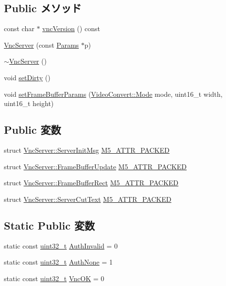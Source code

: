 \subsection*{Public メソッド}
\begin{DoxyCompactItemize}
\item 
const char $\ast$ \hyperlink{group__VncConstants_ga36bab5b0163b272b816361d6214c3f14}{vncVersion} () const 
\item 
\hyperlink{classVncServer_a0438267d56345e85e9422a89bea5c886}{VncServer} (const \hyperlink{classVncServer_a9bc94e8c47d227e70719e2f0b14d23d8}{Params} $\ast$p)
\item 
\hyperlink{classVncServer_a13ae0e928ec930d77353cb1bd42e36a1}{$\sim$VncServer} ()
\item 
void \hyperlink{classVncServer_a92a590790db6444ca7a79eaf5fbcb0d9}{setDirty} ()
\item 
void \hyperlink{classVncServer_a9abef13e07371ccf4a89883649f1bcc5}{setFrameBufferParams} (\hyperlink{classVideoConvert_a46c8a310cf4c094f8c80e1cb8dc1f911}{VideoConvert::Mode} mode, uint16\_\-t width, uint16\_\-t height)
\end{DoxyCompactItemize}
\subsection*{Public 変数}
\begin{DoxyCompactItemize}
\item 
struct \hyperlink{structVncServer_1_1ServerInitMsg}{VncServer::ServerInitMsg} \hyperlink{group__VncConstants_ga2f0a8a1f1c40593e1e01ce4b8087d792}{M5\_\-ATTR\_\-PACKED}
\item 
struct \hyperlink{structVncServer_1_1FrameBufferUpdate}{VncServer::FrameBufferUpdate} \hyperlink{group__VncConstants_ga357314e013d6289c7d085fadd56a290c}{M5\_\-ATTR\_\-PACKED}
\item 
struct \hyperlink{structVncServer_1_1FrameBufferRect}{VncServer::FrameBufferRect} \hyperlink{group__VncConstants_gab34a91a8552f4b2f7e2806b835f39780}{M5\_\-ATTR\_\-PACKED}
\item 
struct \hyperlink{structVncServer_1_1ServerCutText}{VncServer::ServerCutText} \hyperlink{group__VncConstants_gac782a3823c0bb07395a234047394d59e}{M5\_\-ATTR\_\-PACKED}
\end{DoxyCompactItemize}
\subsection*{Static Public 変数}
\begin{DoxyCompactItemize}
\item 
static const \hyperlink{Type_8hh_a435d1572bf3f880d55459d9805097f62}{uint32\_\-t} \hyperlink{group__VncConstants_ga0adb6517a8a2c8403f7aff85bad3dfa5}{AuthInvalid} = 0
\item 
static const \hyperlink{Type_8hh_a435d1572bf3f880d55459d9805097f62}{uint32\_\-t} \hyperlink{group__VncConstants_gabc058a28bda6e015dbafe8bbfbddb821}{AuthNone} = 1
\item 
static const \hyperlink{Type_8hh_a435d1572bf3f880d55459d9805097f62}{uint32\_\-t} \hyperlink{group__VncConstants_ga6d4127ee4f24603d9a0c7e3257b04ca3}{VncOK} = 0
\end{DoxyCompactItemize}
